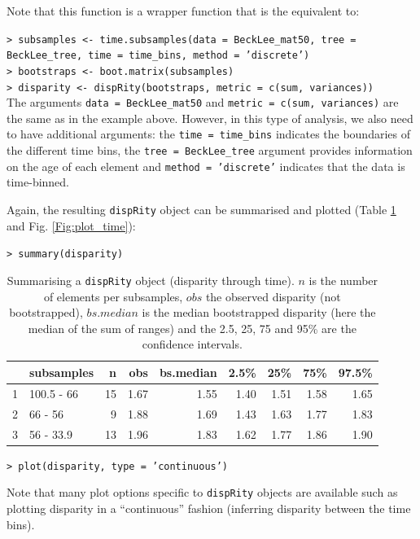 \documentclass[12pt,letterpaper]{article}
\newcommand{\disp}{\texttt{dispRity} }
\begin{document}
\noindent Note that this function is a wrapper function that is the equivalent to:

\noindent \texttt{> subsamples <- time.subsamples(data = BeckLee\_mat50, tree = BeckLee\_tree, time = time\_bins, method = 'discrete')}\\
\noindent \texttt{> bootstraps <- boot.matrix(subsamples)}\\
\noindent \texttt{> disparity <- dispRity(bootstraps, metric = c(sum, variances))}\\

\noindent The arguments \texttt{data = BeckLee\_mat50} and \texttt{metric = c(sum, variances)} are the same as in the example above.
However, in this type of analysis, we also need to have additional arguments: the \texttt{time = time\_bins} indicates the boundaries of the different time bins, the \texttt{tree = BeckLee\_tree} argument provides information on the age of each element and \texttt{method = 'discrete'} indicates that the data is time-binned.

Again, the resulting \disp object can be summarised and plotted (Table \ref{Tab:summary_time} and Fig. \ref{Fig:plot_time}):

\noindent \texttt{> summary(disparity)}

\begin{table}[ht]
\centering
\begin{tabular}{rlrrrrrrr}
  \hline
 & subsamples & n & obs & bs.median & 2.5\% & 25\% & 75\% & 97.5\% \\ 
  \hline
1 & 100.5 - 66 &  15 & 1.67 & 1.55 & 1.40 & 1.51 & 1.58 & 1.65 \\ 
  2 & 66 - 56 &   9 & 1.88 & 1.69 & 1.43 & 1.63 & 1.77 & 1.83 \\ 
  3 & 56 - 33.9 &  13 & 1.96 & 1.83 & 1.62 & 1.77 & 1.86 & 1.90 \\ 
   \hline
\end{tabular}
\caption{Summarising a \disp object (disparity through time). $n$ is the number of elements per subsamples, $obs$ the observed disparity (not bootstrapped), $bs.median$ is the median bootstrapped disparity (here the median of the sum of ranges) and the 2.5, 25, 75 and 95\% are the confidence intervals.}
\label{Tab:summary_time}
\end{table}

\noindent \texttt{> plot(disparity, type = 'continuous')}

\noindent Note that many plot options specific to \disp objects are available such as plotting disparity in a ``continuous'' fashion (inferring disparity between the time bins).
\end{document}
